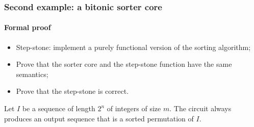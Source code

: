 \documentclass[9pt]{beamer}
\begin{document}








  

\begin{frame}
  \frametitle{Second example: a bitonic sorter core}
  \framesubtitle{Formal proof}
  \begin{itemize}
  \item Step-stone: implement a purely functional version of the
    sorting algorithm;
  \item Prove that the sorter core and the step-stone function have
    the same semantics;
  \item Prove that the step-stone is correct. \\
  \end{itemize}
  \pause
  \pause

  \begin{theorem}
    Let $I$ be a sequence of length $2^n$ of integers of size $m$. The
    circuit always produces an output sequence that is a sorted permutation of $I$.
  \end{theorem}
  
  
\end{frame}  
\end{document}
